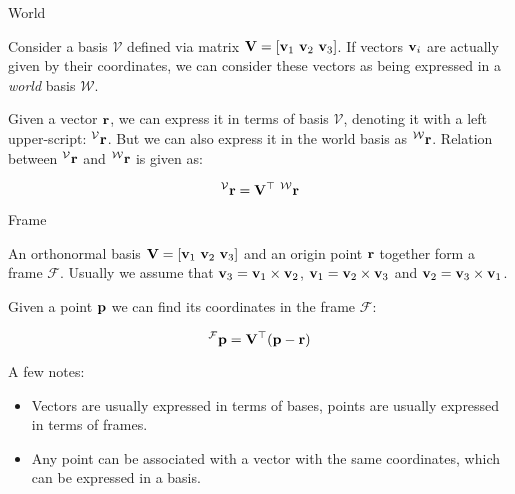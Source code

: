 \documentclass{beamer}
\begin{document}
\begin{frame}{World}
	\begin{flushleft}
		
		
		Consider a basis $\mathcal{V}$ defined via matrix $\bo{V} = [\bo{v}_1 \ \bo{v}_2 \ \bo{v}_3]$. If vectors $\mathbf{v}_i$ are actually given by their coordinates, we can consider these vectors as being expressed in a \emph{world} basis $\mathcal{W}$.
		
		\bigskip
		
		Given a vector $\mathbf{r}$, we can express it in terms of basis $\mathcal{V}$, denoting it with a left upper-script:  $^\mathcal{V} \mathbf{r}$. But we can also express it in the world basis as $^\mathcal{W} \mathbf{r}$. Relation between  $^\mathcal{V} \mathbf{r}$ and  $^\mathcal{W} \mathbf{r}$ is given as:
		
		\begin{equation}
			 ^\mathcal{V} \bo{r} = \bo{V}\T  \ ^\mathcal{W} \bo{r} 
		\end{equation}
		
		
	\end{flushleft}
\end{frame}




\begin{frame}{Frame}
	\begin{flushleft}
		
		An orthonormal basis $\bo{V} = [\bo{v}_1 \ \bo{v}_2 \ \bo{v}_3]$ and an origin point $ \mathbf{r}$ together form a frame $\mathcal{F}$. Usually we assume that $\mathbf{v}_3 = \mathbf{v}_1 \times \mathbf{v}_2$, $\mathbf{v}_1 = \mathbf{v}_2 \times \mathbf{v}_3$ and $\mathbf{v}_2 = \mathbf{v}_3 \times \mathbf{v}_1$.
		
		\bigskip
		
		Given a point $\mathbf{p}$ we can find its coordinates in the frame $\mathcal{F}$:
		
		\begin{equation}
			^\mathcal{F} \mathbf{p} =\mathbf{V}^\top (\mathbf{p} - \mathbf{r})
		\end{equation}
	
		\bigskip
	
		A few notes:
		
		\begin{itemize}
			\item Vectors are usually expressed in terms of bases, points are usually expressed in terms of frames.
			
			\item Any point can be associated with a vector with the same coordinates, which can be expressed in a basis.
		\end{itemize}
		
		
	\end{flushleft}
\end{frame}
\end{document}
